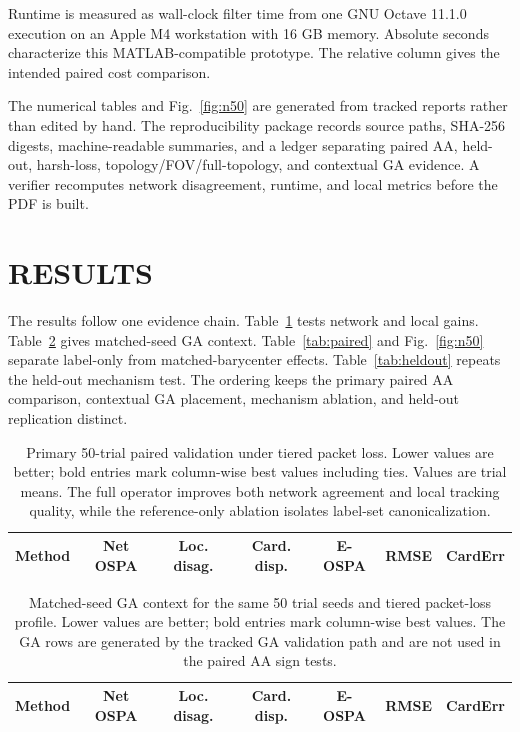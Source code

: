 \documentclass{IEEEtaes}
\begin{document}
Runtime is measured as wall-clock filter time from one GNU Octave 11.1.0 execution on an Apple M4 workstation with 16 GB memory. Absolute seconds characterize this MATLAB-compatible prototype. The relative column gives the intended paired cost comparison.

The numerical tables and Fig.~\ref{fig:n50} are generated from tracked reports rather than edited by hand. The reproducibility package records source paths, SHA-256 digests, machine-readable summaries, and a ledger separating paired AA, held-out, harsh-loss, topology/FOV/full-topology, and contextual GA evidence. A verifier recomputes network disagreement, runtime, and local metrics before the PDF is built.

\section{RESULTS}
The results follow one evidence chain. Table~\ref{tab:n50} tests network and local gains. Table~\ref{tab:reference} gives matched-seed GA context. Table~\ref{tab:paired} and Fig.~\ref{fig:n50} separate label-only from matched-barycenter effects. Table~\ref{tab:heldout} repeats the held-out mechanism test. The ordering keeps the primary paired AA comparison, contextual GA placement, mechanism ablation, and held-out replication distinct.

\begin{table}[t]
\caption{Primary 50-trial paired validation under tiered packet loss. Lower values are better; bold entries mark column-wise best values including ties. Values are trial means. The full operator improves both network agreement and local tracking quality, while the reference-only ablation isolates label-set canonicalization.}
\label{tab:n50}
\centering
\tablefont
\begin{tabular}{lcccccc}
\toprule
Method & Net OSPA & Loc. disag. & Card. disp. & E-OSPA & RMSE & CardErr\\
\midrule

\end{tabular}
\end{table}

\begin{table}[t]
\caption{Matched-seed GA context for the same 50 trial seeds and tiered packet-loss profile. Lower values are better; bold entries mark column-wise best values. The GA rows are generated by the tracked GA validation path and are not used in the paired AA sign tests.}
\label{tab:reference}
\centering
\tablefont
\begin{tabular}{lcccccc}
\toprule
Method & Net OSPA & Loc. disag. & Card. disp. & E-OSPA & RMSE & CardErr\\
\midrule

\end{tabular}
\end{table}
\end{document}

